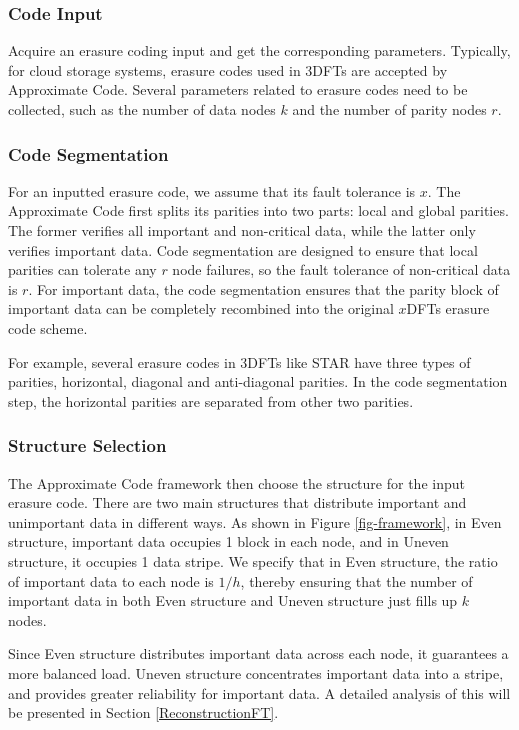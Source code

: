 \documentclass[sigconf]{acmart}
\begin{document}
\subsubsection{Code Input}
Acquire an erasure coding input and get the corresponding parameters. Typically, for cloud storage systems, erasure codes used in 3DFTs are accepted by Approximate Code. Several parameters related to erasure codes need to be collected, such as the number of data nodes $k$ and the number of parity nodes $r$.

\subsubsection{Code Segmentation}
For an inputted erasure code, we assume that its fault tolerance is $x$. The Approximate Code first splits its parities into two parts: local and global parities. The former verifies all important and non-critical data, while the latter only verifies important data. Code segmentation are designed to ensure that local parities can tolerate any $r$ node failures, so the fault tolerance of non-critical data is $r$. For important data, the code segmentation ensures that the parity block of important data can be completely recombined into the original $x$DFTs erasure code scheme. 

For example, several erasure codes in 3DFTs like STAR have three types of parities, horizontal, diagonal and anti-diagonal parities. In the code segmentation step, the horizontal parities are separated from other two parities.

\subsubsection{Structure Selection}
The Approximate Code framework then choose the structure for the input erasure code.
There are two main structures that distribute important and unimportant data in different ways.
As shown in Figure \ref{fig-framework}, in Even structure, important data occupies 1 block in each node, and in Uneven structure, it occupies 1 data stripe.
We specify that in Even structure, the ratio of important data to each node is $1/h$, thereby ensuring that the number of important data in both Even structure and Uneven structure just fills up $k$ nodes.

Since Even structure distributes important data across each node, it guarantees a more balanced load. Uneven structure concentrates important data into a stripe, and provides greater reliability for important data. A detailed analysis of this will be presented in Section \ref{ReconstructionFT}.
\end{document}
